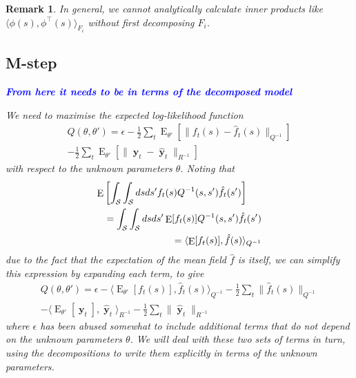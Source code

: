 \documentclass{IEEEtran}
\newcommand{\todo}[1]{\textsf{\emph{\textbf{\textcolor{blue}{#1}}}}}
\newcommand{\inner}[3]{\langle#1,#2\rangle_{#3}}
\newcommand{\dist}[2]{\|#1\|_{#2}}
\DeclareMathOperator{\E}{E}
\DeclareMathOperator{\yvec}{\mathbf{y}}
\newtheorem{remark}{Remark}
\begin{document}
\begin{remark}
    In general, we cannot analytically calculate inner products like $\inner{\phi(s)}{\phi^\top(s)}{F_i}$ without first decomposing $F_i$. 



\subsection{M-step}

\todo{From here it needs to be in terms of the decomposed model}

We need to maximise the expected log-likelihood function
\begin{equation}
	\label{eqn:exploglik}
	\begin{split}
	Q(\theta,\theta') = \epsilon - \frac{1}{2}\sum_t\E_{\theta'}[\dist{f_t(s) - \hat{f}_t(s)}{Q^{-1}}]  \\
	- \frac{1}{2}\sum_t\E_{\theta'}[\dist{\yvec_t-\hat{\yvec}_t}{R^{-1}}]
	\end{split}
\end{equation}
with respect to the unknown parameters $\theta$. Noting that 
\begin{eqnarray}
	\lefteqn{\E\left[\int_\mathcal{S}\int_\mathcal{S}ds ds' f_t(s) Q^{-1}(s,s') \hat{f}_t(s')\right] } \nonumber \\ 
		&& = \int_\mathcal{S}\int_\mathcal{S}ds ds' \E[f_t(s)] Q^{-1}(s,s') \hat{f}_t(s') \\
		&& = \inner{\E[f_t(s)]}{\hat{f}(s)}{Q^{-1}}
\end{eqnarray}
due to the fact that the expectation of the mean field $\hat{f}$ is itself, we can simplify this expression by expanding each term, to give
\begin{equation}
	\begin{split}
	\label{eqn:exloglik}
	Q(\theta,\theta') = \epsilon
	- \inner{\E_{\theta'}[f_t(s)]}{\hat{f}_t(s)}{Q^{-1}}
	- \frac{1}{2}\sum_t \dist{\hat{f}_t(s)}{Q^{-1}} \\
	- \inner{\E_{\theta'}[\yvec_t]}{\hat{\yvec}_t}{R^{-1}}
	- \frac{1}{2}\sum_t \dist{\hat{\yvec}_t}{R^{-1}}
	\end{split}
\end{equation}
where $\epsilon$ has been abused somewhat to include additional terms that do not depend on the unknown parameters $\theta$. We will deal with these two sets of terms in turn, using the decompositions to write them explicitly in terms of the unknown parameters.


\end{remark}
\end{document}

